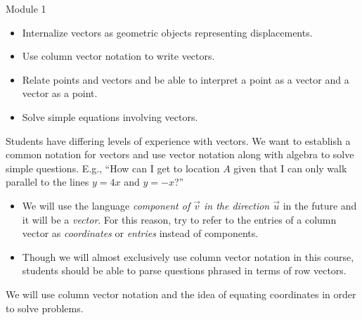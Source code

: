 \begin{lesson}

	Module 1

	\begin{itemize}
		\item Internalize vectors as geometric objects representing displacements.

		\item Use column vector notation to write vectors.

		\item Relate points and vectors and be able to interpret a point as
			a vector and a vector as a point.

		\item Solve simple equations involving vectors.
	\end{itemize}

	 Students have differing levels of experience with vectors.
	We want to establish a common notation for vectors and use vector notation
	along with algebra to solve simple questions. E.g., ``How can I get to location
	$A$ given that I can only walk parallel to the lines $y=4x$ and $y=-x$?''


	\begin{annotation}
		\begin{notes}
			\begin{itemize}
			\item
			We will use the language \emph{component of $\vec v$ in
			the direction $\vec u$} in the future and it will be a \emph{vector}.
			For this reason, try to refer to the entries of a column
			vector as \emph{coordinates} or \emph{entries} instead of components.

			\item
			Though we will almost exclusively use
			column vector notation in this course, students should be able to parse
			questions phrased in terms of row vectors.
			\end{itemize}
		\end{notes}
	\end{annotation}We will use column vector notation and the idea of equating
	coordinates in order to solve problems.

\end{lesson}

